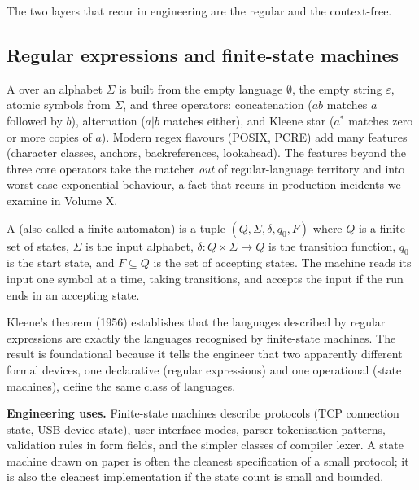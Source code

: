 The two layers that recur in engineering are the regular and the context-free.

\subsection{Regular expressions and finite-state machines}

A  over an alphabet $\Sigma$ is built from the empty language $\emptyset$, the empty string $\varepsilon$, atomic symbols from $\Sigma$, and three operators: concatenation ($ab$ matches $a$ followed by $b$), alternation ($a | b$ matches either), and Kleene star ($a^*$ matches zero or more copies of $a$). Modern regex flavours (POSIX, PCRE) add many features (character classes, anchors, backreferences, lookahead). The features beyond the three core operators take the matcher \emph{out} of regular-language territory and into worst-case exponential behaviour, a fact that recurs in production incidents we examine in Volume X.

A  (also called a finite automaton) is a tuple $(Q, \Sigma, \delta, q_0, F)$ where $Q$ is a finite set of states, $\Sigma$ is the input alphabet, $\delta: Q \times \Sigma \to Q$ is the transition function, $q_0$ is the start state, and $F \subseteq Q$ is the set of accepting states. The machine reads its input one symbol at a time, taking transitions, and accepts the input if the run ends in an accepting state.

Kleene's theorem (1956) establishes that the languages described by regular expressions are exactly the languages recognised by finite-state machines. The result is foundational because it tells the engineer that two apparently different formal devices, one declarative (regular expressions) and one operational (state machines), define the same class of languages.

\textbf{Engineering uses.} Finite-state machines describe protocols (TCP connection state, USB device state), user-interface modes, parser-tokenisation patterns, validation rules in form fields, and the simpler classes of compiler lexer. A state machine drawn on paper is often the cleanest specification of a small protocol; it is also the cleanest implementation if the state count is small and bounded.

